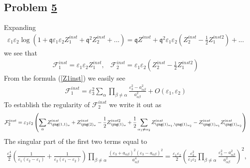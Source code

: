 \documentclass[12pt]{article}
\numberwithin{equation}{section}
\theoremstyle{definition}
\newcommand{\myhref}[2]{\hyperref[#1]{#2}}%
\begin{document}
\subsection{Problem \myhref{prob5}{5}}
Expanding
\begin{align*}
    \varepsilon_1 \varepsilon_2 \log \left( 1 + \mathfrak{q} \varepsilon_1 \varepsilon_2 Z^{inst}_{1} + \mathfrak{q}^2 Z^{inst}_{2} + ... \right) =\mathfrak{q} Z^{inst} + \mathfrak{q}^2 \varepsilon_1 \varepsilon_2 (Z^{inst}_2 - \frac{1}{2}Z^{inst 2}_1 ) + ...
\end{align*}
we see that
\begin{align*}
    \mathcal{F}^{inst}_{1} = \varepsilon_1 \varepsilon_2 Z^{inst}_{1} , \;\;\;
    \mathcal{F}^{inst}_{2} = \varepsilon_1 \varepsilon_2 (Z^{inst}_2 - \frac{1}{2}Z^{inst 2}_1 )
\end{align*}
From the formula (\ref{Z1inst}) we easily see
\begin{align*}
    \mathcal{F}_{1}^{inst} = \varepsilon_3^2 \sum\limits_{\alpha} \prod\limits_{\beta \neq \alpha} \frac{\varepsilon_3^2 - a_{\alpha \beta}^2}{a_{\alpha \beta}^2} + O(\varepsilon_1 , \varepsilon_2 )
\end{align*}
To establish the regularity of $\mathcal{F}^{inst}_{2}$ we write it out as
\begin{align*}
    \mathcal{F}^{inst}_{2} = \varepsilon_1 \varepsilon_2 \left(\sum\limits_{\alpha} Z^{inst}_{\fontsize{2.5}{4}\selectfont\yng(1,1)_{\alpha}} + Z^{inst}_{\fontsize{2.5}{4}\selectfont\yng(2)_{\alpha}} -\frac{1}{2} Z^{inst 2}_{\fontsize{2.5}{4}\selectfont\yng(1)_{\alpha}} + \frac{1}{2}\sum\limits_{\alpha_1 \neq \alpha_2} Z^{inst}_{\fontsize{2.5}{4}\selectfont\yng(1)_{\alpha_1 },  \fontsize{2.5}{4}\selectfont\yng(1)_{\alpha_2 }} - Z^{inst}_{\fontsize{2.5}{4}\selectfont\yng(1)_{\alpha_1}} Z^{inst}_{\fontsize{2.5}{4}\selectfont\yng(1)_{\alpha_2}}\right)
\end{align*}
\newpage
The singular part of the first two terms equal to
\begin{align*}
    \frac{\varepsilon_3^4}{2}\left( \frac{1}{\varepsilon_1 (\varepsilon_2 - \varepsilon_1)} + \frac{1}{\varepsilon_2 (\varepsilon_1 - \varepsilon_2 )}\right) \prod\limits_{\beta \neq \alpha} \frac{(\varepsilon_3 + a_{\alpha \beta})^2 (\varepsilon_3 - a_{\alpha \beta})^2}{a_{\alpha \beta}^4} = \frac{\varepsilon_1 \varepsilon_2}{2}\left( \frac{\varepsilon_3^2}{\varepsilon_1 \varepsilon_2} \prod\limits_{\beta \neq \alpha} \frac{\varepsilon_3^2 - a_{\alpha \beta}^2}{a_{\alpha \beta}^2}\right)^2 ,
\end{align*}
\end{document}
